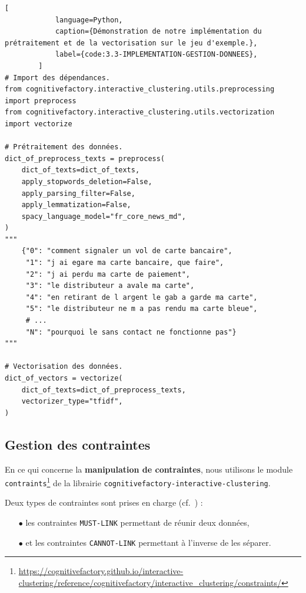 		\begin{lstlisting}[
			language=Python,
			caption={Démonstration de notre implémentation du prétraitement et de la vectorisation sur le jeu d'exemple.},
			label={code:3.3-IMPLEMENTATION-GESTION-DONNEES},
		]
# Import des dépendances.
from cognitivefactory.interactive_clustering.utils.preprocessing import preprocess
from cognitivefactory.interactive_clustering.utils.vectorization import vectorize

# Prétraitement des données.
dict_of_preprocess_texts = preprocess(
	dict_of_texts=dict_of_texts,
	apply_stopwords_deletion=False,
	apply_parsing_filter=False,
	apply_lemmatization=False,
	spacy_language_model="fr_core_news_md",
)
"""
	{"0": "comment signaler un vol de carte bancaire",
	 "1": "j ai egare ma carte bancaire, que faire",
	 "2": "j ai perdu ma carte de paiement",
	 "3": "le distributeur a avale ma carte",
	 "4": "en retirant de l argent le gab a garde ma carte",
	 "5": "le distributeur ne m a pas rendu ma carte bleue",
	 # ...
	 "N": "pourquoi le sans contact ne fonctionne pas"}
"""

# Vectorisation des données.
dict_of_vectors = vectorize(
	dict_of_texts=dict_of_preprocess_texts,
	vectorizer_type="tfidf",
)
		\end{lstlisting}
		
		\subsection{Gestion des contraintes}
		\label{section:3.3.2-GESTION-DES-CONTRAINTES}
		
		En ce qui concerne la \textbf{manipulation de contraintes}, nous utilisons le module \texttt{contraints}\footnote{\url{https://cognitivefactory.github.io/interactive-clustering/reference/cognitivefactory/interactive_clustering/constraints/}} de la librairie \texttt{cognitivefactory-interactive-clustering}.
		
		Deux types de contraintes sont prises en charge (cf.~\cite{wagstaff-cardie:2000:clustering-instancelevel-constraints}) :
		\begin{itemize}
			\item[\(\bullet\)] les contraintes \texttt{MUST-LINK} permettant de réunir deux données,
			\item[\(\bullet\)] et les contraintes \texttt{CANNOT-LINK} permettant à l'inverse de les séparer.
		\end{itemize}

